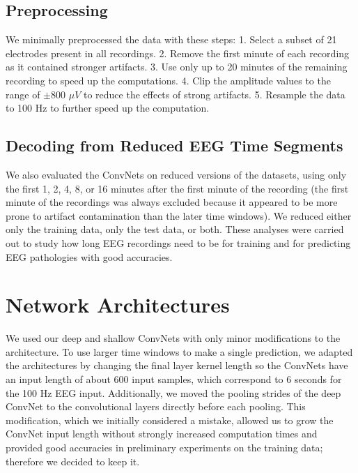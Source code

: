 \subsection{Preprocessing}\label{preprocessing}

    We minimally preprocessed the data with these steps: 1. Select a subset
of 21 electrodes present in all recordings. 2. Remove the first minute
of each recording as it contained stronger artifacts. 3. Use only up to
20 minutes of the remaining recording to speed up the computations. 4.
Clip the amplitude values to the range of $\pm800$ $\mu V$ to reduce
the effects of strong artifacts. 5. Resample the data to 100 Hz to
further speed up the computation.

\subsection{Decoding from Reduced EEG Time
Segments}\label{decoding-from-reduced-eeg-time-segments}

    We also evaluated the ConvNets on reduced versions of the datasets,
using only the first 1, 2, 4, 8, or 16 minutes after the first minute of
the recording (the first minute of the recordings was always excluded
because it appeared to be more prone to artifact contamination than the
later time windows). We reduced either only the training data, only the
test data, or both. These analyses were carried out to study how long
EEG recordings need to be for training and for predicting EEG
pathologies with good accuracies.

\section{Network Architectures}\label{network-architectures}

    We used our deep and shallow ConvNets with only minor modifications to
the architecture. To use larger time windows to make a single
prediction, we adapted the architectures by changing the final layer
kernel length so the ConvNets have an input length of about 600 input
samples, which correspond to 6 seconds for the 100 Hz EEG input.
Additionally, we moved the pooling strides of the deep ConvNet to the
convolutional layers directly before each pooling. This modification,
which we initially considered a mistake, allowed us to grow the ConvNet
input length without strongly increased computation times and provided
good accuracies in preliminary experiments on the training data;
therefore we decided to keep it.

